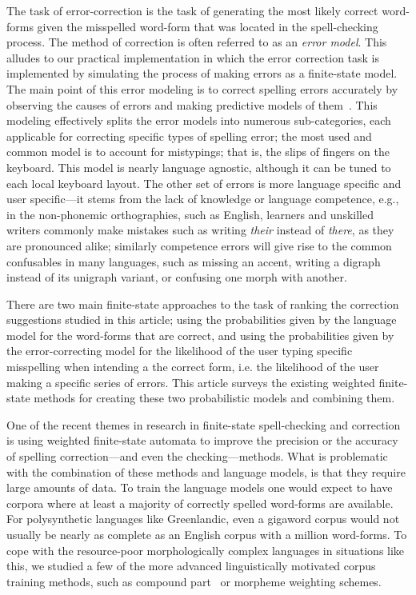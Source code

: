 \documentclass[a4paper,12pt]{article}
\begin{document}
The task of error-correction is the task of generating the most
likely correct word-forms given the misspelled word-form that was located in the
spell-checking process. The method of correction is often referred to as an
\emph{error model}. This alludes to our practical implementation in which the
error correction task is implemented by simulating the process of making errors
as a finite-state model. The main point of this error modeling is to correct
spelling errors accurately by observing the causes of errors and making
predictive models of them~\cite[]{deorowicz2005correcting}. This modeling
effectively splits the error models into numerous sub-categories, each
applicable for correcting specific types of spelling error; the most used and
common model is to account for mistypings; that is, the slips of fingers on
the keyboard. This model is nearly language agnostic, although it can be tuned
to each local keyboard layout. The other set of errors is more language
specific and user specific---it stems from the lack of knowledge or language
competence, e.g., in the non-phonemic orthographies, such as English,
learners and unskilled writers commonly make mistakes such as writing
\emph{their} instead of \emph{there}, as they are pronounced alike; similarly
competence errors will give rise to the common confusables in many languages,
such as missing an accent, writing a digraph instead of its unigraph variant,
or confusing one morph with another.

There are two main finite-state approaches to the task of ranking the
correction suggestions studied in this article; using the probabilities given
by the language model for the word-forms that are correct, and using the
probabilities given by the error-correcting model for the likelihood of the
user typing specific misspelling when intending a the correct form, i.e. the
likelihood of the user making a specific series of errors. This article surveys
the existing weighted finite-state methods for creating these two probabilistic
models and combining them.

One of the recent themes in research in finite-state spell-checking and
correction is using weighted finite-state automata to improve the precision
or the accuracy of spelling correction---and even the checking---methods.
What is problematic with the combination of these methods and language models,
is that they require large amounts of data. To train the language models one
would expect to have corpora where at least a majority of correctly spelled
word-forms are available. For polysynthetic languages like Greenlandic, even
a gigaword corpus would not usually be nearly as complete as an English corpus
with a million word-forms. To cope with the resource-poor morphologically
complex languages in situations like this, we studied a few of the more
advanced linguistically motivated corpus training methods, such as compound
part~\cite[]{pirinen/2009/nodalida} or morpheme weighting schemes.
\end{document}
